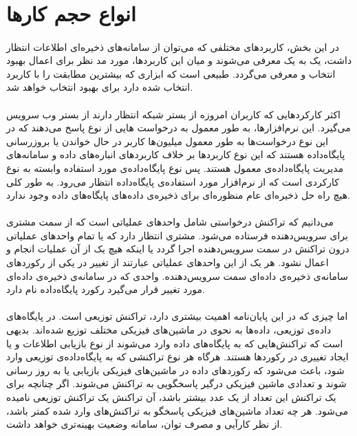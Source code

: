 ‌‌\section{انواع حجم کارها} \label{section:workload-types}

\paragraph*{}
در این بخش، کاربردهای مختلفی که می‌توان از سامانه‌های ذخیره‌ای اطلاعات انتظار داشت، یک به یک معرفی می‌شوند و میان این کاربردها، مورد مد نظر برای اعمال بهبود انتخاب و معرفی می‌گردد. طبیعی است که ابزاری که بیشترین مطابقت را با کاربرد انتخاب شده دارد برای بهبود انتخاب خواهد شد.

\paragraph*{}
اکثر کارکردهایی که کاربران امروزه از بستر شبکه انتظار دارند از بستر وب
سرویس می‌گیرد. این نرم‌افزارها، به طور معمول به درخواست هایی از نوع
پاسخ می‌دهند که در این نوع درخواست‌ها به طور معمول میلیون‌ها کاربر در حال خواندن یا بروزرسانی پایگاه‌داده هستند که این نوع کاربردها بر خلاف کاربردهای انباره‌های داده و سامانه‌های مدیریت پایگاه‌داده‌ی معمول هستند.
\cite{cattell-2011}
پس نوع پایگاه‌داده‌ی مورد استفاده وابسته به نوع کارکردی است که از نرم‌افزار مورد استفاده‌ی پایگاه‌داده انتظار می‌رود. به طور کلی هیچ راه حل ذخیره‌ای عام منظوره‌ای برای ذخیره‌ی داده‌های پایگاه‌های داده وجود ندارد.

\paragraph*{}
می‌دانیم که تراکنش درخواستی شامل واحدهای عملیاتی است که از سمت مشتری برای سرویس‌دهنده فرستاده می‌شود. مشتری انتظار دارد که یا تمام واحدهای عملیاتی درون تراکنش در سمت سرویس‌دهنده اجرا گردد یا اینکه هیچ یک از آن عملیات انجام و اعمال نشود. هر یک از این واحدهای عملیاتی عبارتند از تغییر در یکی از رکوردهای سامانه‌ی ذخیره‌ی داده‌ای سمت سرویس‌دهنده. واحدی که در سامانه‌ی ذخیره‌ی داده‌ای مورد تغییر قرار می‌گیرد رکورد پایگاه‌داده نام دارد.
\cite{elastras-2010}

\paragraph*{}
اما چیزی که در این پایان‌نامه اهمیت بیشتری دارد، تراکنش توزیعی است. در پایگاه‌های داده‌ی توزیعی، داده‌ها به نحوی در ماشین‌های فیزیکی مختلف توزیع شده‌اند.
\cite{schism-2010}
بدیهی است که تراکنش‌هایی که به پایگاه‌های داده وارد می‌شوند از نوع بازیابی اطلاعات و یا ایجاد تغییری در رکوردها هستند. هرگاه هر نوع تراکنشی که به پایگاه‌داده‌ی توزیعی وارد شود، باعث می‌شود که رکوردهای داده در ماشین‌های فیزیکی بازیابی یا به روز رسانی شوند و تعدادی ماشین فیزیکی درگیر پاسخگویی به تراکنش می‌شوند. اگر چنانچه برای یک تراکنش این تعداد از یک عدد بیشتر باشد، آن تراکنش یک تراکنش توزیعی
نامیده می‌شود. هر چه تعداد ماشین‌های فیزیکی پاسخگو به تراکنش‌های وارد شده کمتر باشد، از نظر کارآیی و مصرف توان، سامانه وضعیت بهینه‌تری خواهد داشت.
\cite{kamal-2016}

